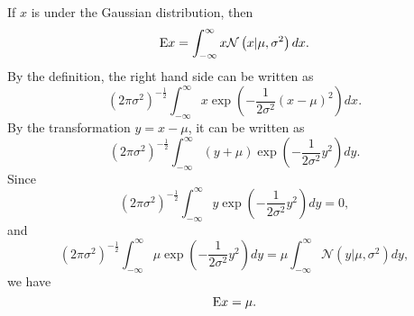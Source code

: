 \subsection{}
If $x$ is under the Gaussian distribution, then
%
\begin{equation}
{\rm E} x = \int_{-\infty}^{\infty} x \mathcal{N} \left( x | \mu, \sigma ^ 2 \right) dx.
\end{equation}
%
By the definition, the right hand side can be written as
%
\begin{equation}
\left( 2 \pi \sigma ^ 2 \right) ^ {-\frac{1}{2}} \int_{-\infty}^{\infty} x \exp \left( -\frac{1}{2 \sigma ^ 2} (x - \mu) ^ 2 \right) dx.
\end{equation}
%
By the transformation $y = x - \mu$, it can be written as 
%
\begin{equation}
\left( 2 \pi \sigma ^ 2 \right) ^ {-\frac{1}{2}} \int_{-\infty}^{\infty} (y + \mu) \exp \left( -\frac{1}{2 \sigma ^ 2}y ^ 2 \right) dy.
\end{equation}
%
Since 
%
\begin{equation}
\left( 2 \pi \sigma ^ 2 \right) ^ {-\frac{1}{2}} \int_{-\infty}^{\infty} y \exp \left( -\frac{1}{2 \sigma ^ 2}y ^ 2 \right) dy = 0,
\end{equation}
%
and
%
\begin{equation}
\left( 2 \pi \sigma ^ 2 \right) ^ {-\frac{1}{2}} \int_{-\infty}^{\infty} \mu \exp \left( -\frac{1}{2 \sigma ^ 2}y ^ 2 \right) dy = \mu \int_{- \infty}^{\infty} \mathcal{N} \left( y | \mu, \sigma ^ 2 \right) dy,
\end{equation}
%
we have
%
\begin{equation}
{\rm E} x = \mu.
\end{equation}
%

